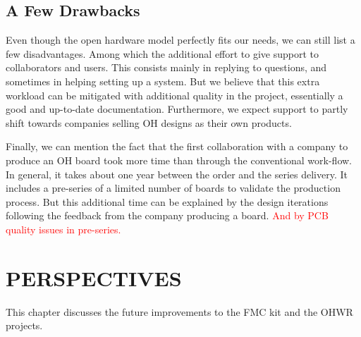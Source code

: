 \documentclass{JAC2003}
\begin{document}



\subsection{A Few Drawbacks}
Even though the open hardware model perfectly fits our needs, we can still list a few disadvantages.
Among which the additional effort to give support to collaborators and users.
This consists mainly in replying to questions, and sometimes in helping setting up a system.
But we believe that this extra workload can be mitigated with additional quality in the project, essentially a good and up-to-date documentation.
Furthermore, we expect support to partly shift towards companies selling OH designs as their own products.

Finally, we can mention the fact that the first collaboration with a company to produce an OH board took more time than through the conventional work-flow.
In general, it takes about one year between the order and the series delivery.
It includes a pre-series of a limited number of boards to validate the production process.
But this additional time can be explained by the design iterations following the feedback from the company producing a board.
\textcolor{red}{And by PCB quality issues in pre-series.}


\section{PERSPECTIVES}
This chapter discusses the future improvements to the FMC kit and the OHWR projects.
\end{document}
